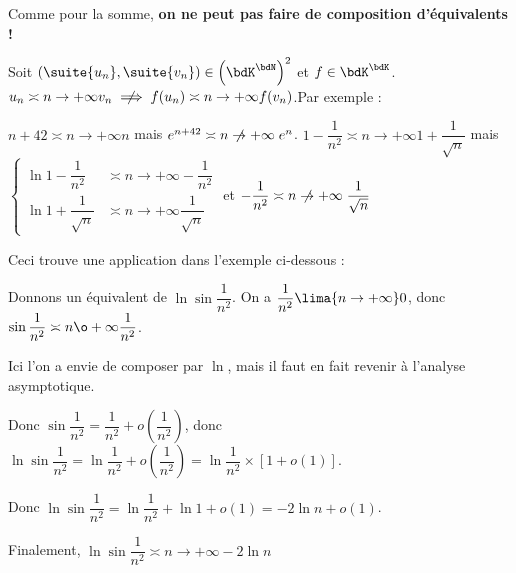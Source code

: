\documentclass[a4paper,french,bookmarks]{article}
\begin{document}
\begin{warning}{}{}
    Comme pour la somme, \bf{on ne peut pas faire de composition d'équivalents !}
    
    Soit $\left(\suite{u_n}, \suite{v_n}\right) \in \left(\bdK^\bdN\right)^2$ et $f \in \bdK^\bdK$. $ u_n \asymp{n \to +\infty} v_n \centernot\implies f(u_n) \asymp{n \to +\infty} f(v_n)$.Par exemple :
    \begin{enumerate}
        \itarr $n + 42 \asymp{n \to +\infty} n$ mais $e^{n + 42} \centernot{\asymp{n \to +\infty}} e^n$.
        \itarr $1 - \dfrac{1}{n^2} \asymp{n \to +\infty} 1 + \dfrac{1}{\sqrt{n}}$ mais $\left\lbrace\begin{array}{ll}
            \ln{1 - \dfrac{1}{n^2}} &\asymp{n \to +\infty} - \dfrac{1}{n^2}\\
            \ln{1 + \dfrac{1}{\sqrt{n}}} &\asymp{n \to +\infty} \dfrac{1}{\sqrt{n}}
        \end{array}\right.$ et $-\dfrac{1}{n^2} \centernot{\asymp{n \to +\infty}} \dfrac{1}{\sqrt{n}}$
    \end{enumerate}
\end{warning}
Ceci trouve une application dans l'exemple ci-dessous :
\begin{example}{}{}
    Donnons un équivalent de $\ln{\sin{\dfrac{1}{n^2}}}$. On a $\dfrac{1}{n^2} \lima{n \to +\infty} 0$, donc $\sin{\dfrac{1}{n^2}} \asymp{n \o +\infty} \dfrac{1}{n^2}$.
    
    \begin{centering}
     Ici l'on a envie de composer par $\ln$, mais il faut en fait revenir à l'analyse asymptotique.
    \end{centering}
    
    Donc $\sin{\dfrac{1}{n^2}} = \dfrac{1}{n^2} + o\left(\dfrac{1}{n^2}\right)$, donc $\ln{\sin{\dfrac{1}{n^2}}} = \ln{\dfrac{1}{n^2} + o\left(\dfrac{1}{n^2}\right)} = \ln{\dfrac{1}{n^2}\times\left[1+o(1)\right]}$.
    
    Donc $\ln{\sin{\dfrac{1}{n^2}}} = \ln{\dfrac{1}{n^2}} + \ln{1+o(1)} = -2\ln{n} + o(1)$.
    
    Finalement, $\ln{\sin{\dfrac{1}{n^2}}} \asymp{n \to +\infty} -2\ln{n}$
\end{example}
\end{document}
